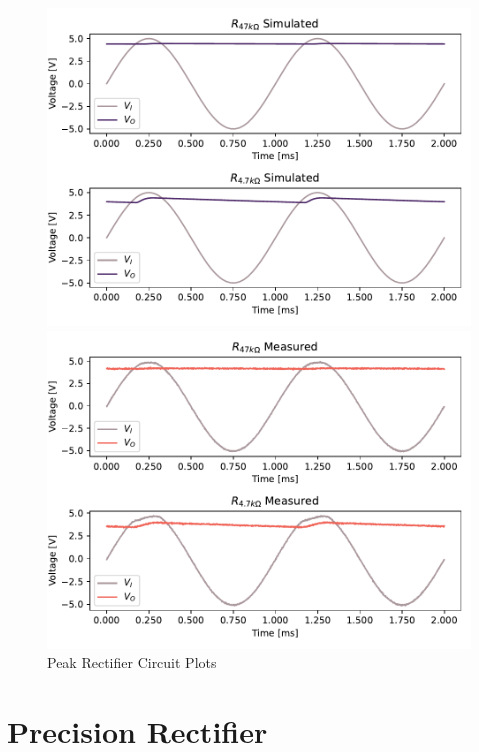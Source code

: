 \documentclass{../../ece-report}
\begin{document}
\begin{figure}[h!]
  \centering
  \begin{minipage}{.45\textwidth}
    \includegraphics[width=\textwidth]{../figures/peak/peak_sim.pdf}
  \end{minipage}
  \begin{minipage}{.45\textwidth}
    \includegraphics[width=\textwidth]{../figures/peak/peak_measured.pdf}
  \end{minipage}
  \caption{Peak Rectifier Circuit Plots}
  \label{fig:peak_plots}
\end{figure}

\section{Precision Rectifier}
\end{document}
